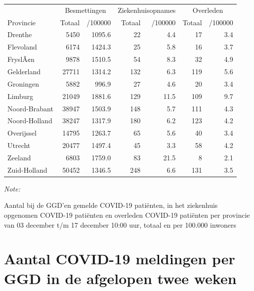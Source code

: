 \documentclass[
  english,
  man,floatsintext]{apa6}
\begin{document}
\begin{table}
\centering
\begin{threeparttable}
\begin{tabular}{lrrrrrr}
\toprule
\multicolumn{1}{c}{ } & \multicolumn{2}{c}{Besmettingen} & \multicolumn{2}{c}{Ziekenhuisopnames} & \multicolumn{2}{c}{Overleden} \\
\cmidrule(l{3pt}r{3pt}){2-3} \cmidrule(l{3pt}r{3pt}){4-5} \cmidrule(l{3pt}r{3pt}){6-7}
Provincie & Totaal & /100000 & Totaal & /100000 & Totaal & /100000\\
\midrule
Drenthe & 5450 & 1095.6 & 22 & 4.4 & 17 & 3.4\\
Flevoland & 6174 & 1424.3 & 25 & 5.8 & 16 & 3.7\\
FryslÃ¢n & 9878 & 1510.5 & 54 & 8.3 & 32 & 4.9\\
Gelderland & 27711 & 1314.2 & 132 & 6.3 & 119 & 5.6\\
Groningen & 5882 & 996.9 & 27 & 4.6 & 20 & 3.4\\
Limburg & 21049 & 1881.6 & 129 & 11.5 & 109 & 9.7\\
Noord-Brabant & 38947 & 1503.9 & 148 & 5.7 & 111 & 4.3\\
Noord-Holland & 38247 & 1317.9 & 180 & 6.2 & 123 & 4.2\\
Overijssel & 14795 & 1263.7 & 65 & 5.6 & 40 & 3.4\\
Utrecht & 20477 & 1497.4 & 45 & 3.3 & 58 & 4.2\\
Zeeland & 6803 & 1759.0 & 83 & 21.5 & 8 & 2.1\\
Zuid-Holland & 50452 & 1346.5 & 248 & 6.6 & 131 & 3.5\\
\bottomrule
\end{tabular}
\begin{tablenotes}
\item \textit{Note: } 
\item Aantal bij de GGD’en gemelde COVID-19 patiënten, in het ziekenhuis opgenomen COVID-19 patiënten en overleden COVID-19 patiënten per provincie van 03 december t/m 17 december 10:00 uur, totaal en per 100.000 inwoners
\end{tablenotes}
\end{threeparttable}
\end{table}

\newpage

\hypertarget{aantal-covid-19-meldingen-per-ggd-in-de-afgelopen-twee-weken}{%
\section{Aantal COVID-19 meldingen per GGD in de afgelopen twee weken}\label{aantal-covid-19-meldingen-per-ggd-in-de-afgelopen-twee-weken}}
\end{document}
